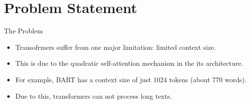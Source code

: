 \section{Problem Statement}

	\begin{frame}{The Problem}

		\begin{itemize}
			\item Transofrmers suffer from one major limitation: limited context size.
			\item This is due to the quadratic self-attention mechanism in the its architecture.
			\item For example, BART has a context size of just 1024 tokens (about 770 words).
			\item Due to this, transformers can not process long texts.
		\end{itemize}

	\end{frame}
